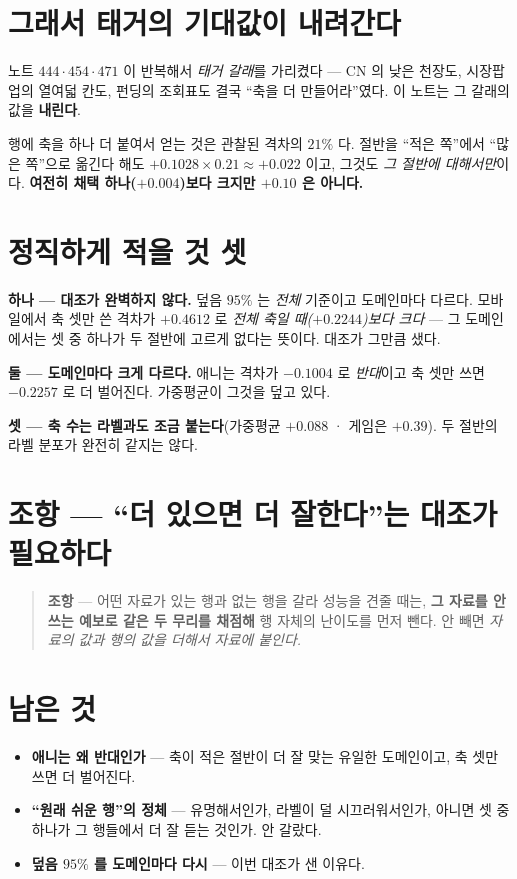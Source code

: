 \documentclass[11pt]{article}
\begin{document}
\section{그래서 태거의 기대값이 내려간다}

노트 $444 \cdot 454 \cdot 471$ 이 반복해서 \emph{태거 갈래}를 가리켰다
--- CN 의 낮은 천장도, 시장팝업의 열여덟 칸도, 펀딩의 조회표도 결국
``축을 더 만들어라''였다. 이 노트는 그 갈래의 값을 \textbf{내린다}.

행에 축을 하나 더 붙여서 얻는 것은 관찰된 격차의 $21\%$ 다. 절반을
``적은 쪽''에서 ``많은 쪽''으로 옮긴다 해도 $+0.1028 \times 0.21 \approx
+0.022$ 이고, 그것도 \emph{그 절반에 대해서만}이다. \textbf{여전히
채택 하나($+0.004$)보다 크지만 $+0.10$ 은 아니다.}

\section{정직하게 적을 것 셋}

\textbf{하나 --- 대조가 완벽하지 않다.} 덮음 $95\%$ 는 \emph{전체}
기준이고 도메인마다 다르다. 모바일에서 축 셋만 쓴 격차가 $+0.4612$ 로
\emph{전체 축일 때($+0.2244$)보다 크다} --- 그 도메인에서는 셋 중 하나가
두 절반에 고르게 없다는 뜻이다. 대조가 그만큼 샜다.

\textbf{둘 --- 도메인마다 크게 다르다.} 애니는 격차가 $-0.1004$ 로
\emph{반대}이고 축 셋만 쓰면 $-0.2257$ 로 더 벌어진다. 가중평균이 그것을
덮고 있다.

\textbf{셋 --- 축 수는 라벨과도 조금 붙는다}(가중평균 $+0.088$ · 게임은
$+0.39$). 두 절반의 라벨 분포가 완전히 같지는 않다.

\section*{조항 --- ``더 있으면 더 잘한다''는 대조가 필요하다}

\begin{quote}
\textbf{조항} --- 어떤 자료가 있는 행과 없는 행을 갈라 성능을 견줄 때는,
\textbf{그 자료를 안 쓰는 예보로 같은 두 무리를 채점해} 행 자체의
난이도를 먼저 뺀다. 안 빼면 \emph{자료의 값과 행의 값을 더해서 자료에
붙인다.}
\end{quote}

\section*{남은 것}

\begin{itemize}
\item \textbf{애니는 왜 반대인가} --- 축이 적은 절반이 더 잘 맞는
유일한 도메인이고, 축 셋만 쓰면 더 벌어진다.
\item \textbf{``원래 쉬운 행''의 정체} --- 유명해서인가, 라벨이 덜
시끄러워서인가, 아니면 셋 중 하나가 그 행들에서 더 잘 듣는 것인가.
안 갈랐다.
\item \textbf{덮음 $95\%$ 를 도메인마다 다시} --- 이번 대조가 샌 이유다.
\end{itemize}
\end{document}
